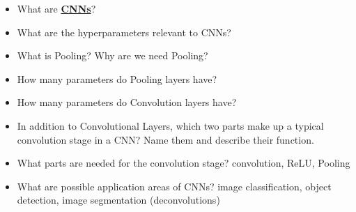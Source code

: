 \documentclass{report}
\begin{document}
\begin{itemize}
		\item What are \textbf{\underline{CNNs}}?
		\newline 
		\item What are the hyperparameters relevant to CNNs?
		\newline 
		\item What is Pooling? Why are we need Pooling?
		\newline 
		\item How many parameters do Pooling layers have?
		\newline 
		\item How many parameters do Convolution layers have?
		\newline 
		\item In addition to Convolutional Layers, which two parts make up a typical convolution stage in a CNN? Name them and describe their function.
		\newline 
		\item What parts are needed for the convolution stage?
		\newline convolution, ReLU, Pooling
		\item What are possible application areas of CNNs?
		\newline image classification, object detection, image segmentation (deconvolutions)
		

\end{itemize}
\end{document}
